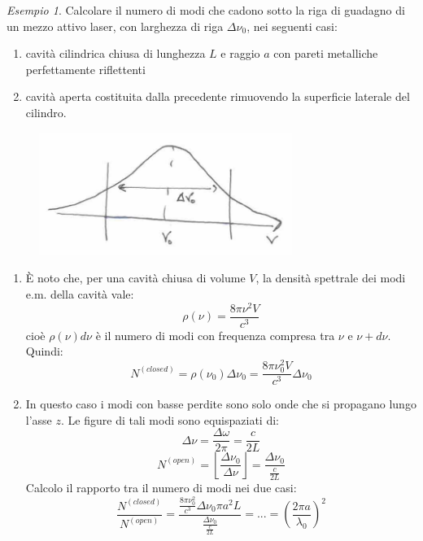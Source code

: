 \documentclass{book}
\def \D {\Delta}
\def \l {\lambda}
\theoremstyle{remark}
\newtheorem{example}{Esempio}[section]
\begin{document}
\begin{example}
Calcolare il numero di modi che cadono sotto la riga di guadagno di un mezzo attivo laser, con larghezza di riga $\D\nu_0$, nei seguenti casi:
\begin{enumerate}
\item cavità cilindrica chiusa di lunghezza $L$ e raggio $a$ con pareti metalliche perfettamente riflettenti
\item cavità aperta costituita dalla precedente rimuovendo la superficie laterale del cilindro.
\end{enumerate}
\begin{figure}[H]
\centering
\includegraphics[height=4cm]{images/16.jpg}
\end{figure}
\begin{enumerate}
\item È noto che, per una cavità chiusa di volume $V$, la densità spettrale dei modi e.m. della cavità vale:
\begin{equation*}
\rho(\nu) = \frac{8\pi \nu^2 V}{c^3}
\end{equation*}
cioè $\rho(\nu) d\nu$ è il numero di modi con frequenza compresa tra $\nu$ e $\nu + d\nu$.
Quindi:
\begin{equation*}
N^{(closed)} = \rho(\nu_0) \D \nu_0 = \frac{8\pi \nu_0^2 V}{c^3} \D\nu_0
\end{equation*}
\item In questo caso i modi con basse perdite sono solo onde che si propagano lungo l'asse $z$. Le figure di tali modi sono equispaziati di:
\begin{equation*}
\D\nu = \frac{\D\omega}{2\pi} = \frac{c}{2L}
\end{equation*}
\begin{equation*}
N^{(open)} = \left\lfloor \frac{\D \nu_0}{\D \nu} \right\rfloor = \frac{\D \nu_0}{\frac{c}{2L}}
\end{equation*}
Calcolo il rapporto tra il numero di modi nei due casi:
\begin{equation*}
\frac{N^{(closed)}}{N^{(open)}} = \frac{\frac{8\pi \nu_0^2}{c^3} \D \nu_0 \pi a^2 L}{\frac{\D \nu_0}{\frac{c}{2L}}} = ... = \left( \frac{2\pi a}{\l_0} \right)^2
\end{equation*}
\end{enumerate}


\end{example}
\end{document}

